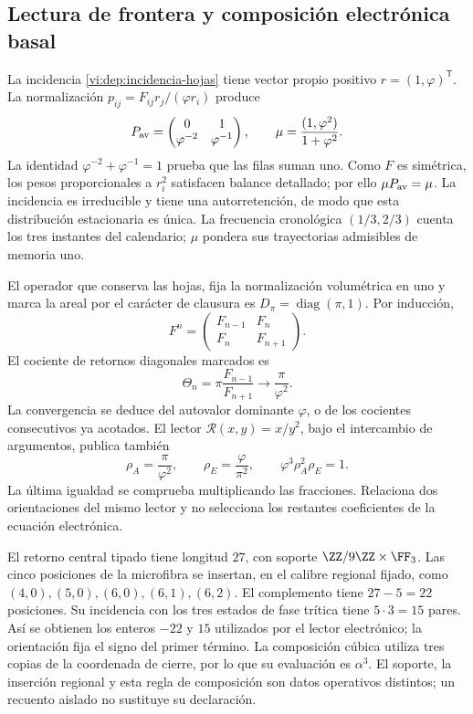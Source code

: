 \subsection{Lectura de frontera y composición electrónica basal}
\label{vi:dep:basal}

La incidencia \eqref{vi:dep:incidencia-hojas} tiene vector propio
positivo \(r=(1,\varphi)^{\mathsf T}\). La normalización
\(p_{ij}=F_{ij}r_j/(\varphi r_i)\) produce
\[
 P_{\rm av}=\begin{pmatrix}0&1\\\varphi^{-2}&\varphi^{-1}\end{pmatrix},
 \qquad \mu=\frac{(1,\varphi^2)}{1+\varphi^2}.
\]
La identidad \(\varphi^{-2}+\varphi^{-1}=1\) prueba que las filas
suman uno. Como \(F\) es simétrica, los pesos proporcionales a
\(r_i^2\) satisfacen balance detallado; por ello \(\mu P_{\rm av}=\mu\).
La incidencia es irreducible y tiene una autorretención, de modo que
esta distribución estacionaria es única. La frecuencia cronológica
\((1/3,2/3)\) cuenta los tres instantes del calendario; \(\mu\)
pondera sus trayectorias admisibles de memoria uno.

El operador que conserva las hojas, fija la normalización volumétrica
en uno y marca la areal por el carácter de clausura es
\(D_\pi=\operatorname{diag}(\pi,1)\). Por inducción,
\[
 F^n=\begin{pmatrix}F_{n-1}&F_n\\F_n&F_{n+1}\end{pmatrix}.
\]
El cociente de retornos diagonales marcados es
\[
 \Theta_n=\pi\frac{F_{n-1}}{F_{n+1}}
 \longrightarrow\frac{\pi}{\varphi^2}.
\]
La convergencia se deduce del autovalor dominante \(\varphi\), o de
los cocientes consecutivos ya acotados. El lector
\(\mathcal R(x,y)=x/y^2\), bajo el intercambio de argumentos,
publica también
\begin{equation}
 \rho_A=\frac{\pi}{\varphi^2},\qquad
 \rho_E=\frac{\varphi}{\pi^2},\qquad
 \varphi^3\rho_A^2\rho_E=1.
 \label{vi:dep:dos-orientaciones}
\end{equation}
La última igualdad se comprueba multiplicando las fracciones.
Relaciona dos orientaciones del mismo lector y no selecciona los
restantes coeficientes de la ecuación electrónica.

El retorno central tipado tiene longitud \(27\), con soporte
\(\ZZ/9\ZZ\times\FF_3\). Las cinco posiciones de la microfibra
se insertan, en el calibre regional fijado, como
\((4,0),(5,0),(6,0),(6,1),(6,2)\).
El complemento tiene \(27-5=22\) posiciones. Su incidencia con los
tres estados de fase trítica tiene \(5\cdot3=15\) pares.
Así se obtienen los enteros \(-22\) y \(15\) utilizados por el
lector electrónico; la orientación fija el signo del primer término.
La composición cúbica utiliza tres copias de la coordenada de cierre,
por lo que su evaluación es \(\alpha^3\). El soporte, la inserción
regional y esta regla de composición son datos operativos distintos;
un recuento aislado no sustituye su declaración.

